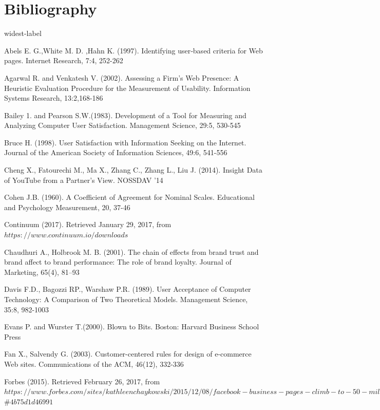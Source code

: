 \documentclass{book}
\begin{document}
\chapter{Bibliography}
\begin{thebibliography}{widest-label}

Abels E. G.,White M. D. ,Hahn K. (1997). Identifying user‐based criteria for Web pages. Internet Research, 7:4, 252-262

Agarwal R. and Venkatesh V. (2002). Assessing a Firm's Web Presence: A Heuristic Evaluation Procedure for the
Measurement of Usability. Information Systems Research, 13:2,168-186

Bailey 1. and Pearson S.W.(1983). Development of a Tool for Measuring and Analyzing Computer User Satisfaction.
Management Science, 29:5, 530-545

Bruce H. (1998). User Satisfaction with Information Seeking on the Internet. Journal of the American Society of Information Sciences, 49:6, 541-556

Cheng X., Fatourechi M., Ma X., Zhang C., Zhang L., Liu J. (2014). Insight Data of YouTube from a Partner’s View. NOSSDAV '14

Cohen J.B. (1960). A Coefficient of Agreement for Nominal Scales. Educational and Psychology Measurement, 20,
37-46

Continuum (2017). Retrieved January 29, 2017, from $https://www.continuum.io/downloads$

Chaudhuri A., Holbrook M. B. (2001). The chain of effects from brand trust and brand affect to brand performance: The role of brand loyalty. Journal of Marketing, 65(4), 81–93

Davis F.D., Bagozzi RP., Warshaw P.R. (1989). User Acceptance of Computer Technology: A Comparison of
Two Theoretical Models. Management Science, 35:8, 982-1003

Evans P. and Wurster T.(2000). Blown to Bits. Boston: Harvard Business School Press

Fan X., Salvendy G. (2003). Customer-centered rules for design of e-commerce Web sites. Communications of the ACM, 46(12), 332-336

Forbes (2015). Retrieved February 26, 2017, from $https://www.forbes.com/sites/kathleenchaykowski/2015/12/08/facebook-business-pages-climb-to-50-million-with-new-messaging-tools/$\#$4b75d1d46991$


\end{thebibliography}
\end{document}
